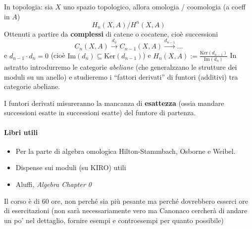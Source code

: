 In topologia: sia \(X\) uno spazio topologico, allora omologia / coomologia (a
coeff in \(A\)) 
\[
  H_{n}{(X, A)} / H^{n}{(X, A)}
\]
Ottenuti a partire da \textbf{complessi} di catene o cocatene, cioè successioni
\[
    C_{n}{(X, A)} \overset{d_{n}}{\to } C_{n-1} {(X, A)} \overset{d_{n-1} }{\to } \dots
\]
e \(d_{n-1} \cdot d_{n} = 0\) (cioè \(\mathrm {Im} {(d_{n})} \subseteq \mathrm{Ker}{(d_{n-1} )} \))  e \(H_{n} {(X, A)} := \frac{\mathrm{Ker}{(d_{n-1} )}}{\mathrm{Im}{(d_{n})}}\) 
In astratto introdurremo le categorie \emph{abeliane} (che generalzzano le
strutture dei moduli su un anello) e studieremo i ``fattori derivati'' di
funtori (additivi) tra categorie abeliane.

I funtori derivati misureranno la mancanza di \textbf{esattezza} (ossia mandare
successioni esatte in successioni esatte) del funtore di
partenza.

\paragraph{Libri utili}
\begin{itemize}[label = --]
    \item Per la parte di algebra omologica Hilton-Stammbach, Osborne e
Weibel.
    \item Dispense sui moduli (su KIRO) utili
    \item Aluffi, \emph{Algebra Chapter 0}
\end{itemize}
Il corso è di 60 ore, non perché sia più pesante ma perché dovrebbero esserci
ore di esercitazioni (non sarà necessariamente vero ma Canonaco cercherà di
andare un po' nel dettaglio, fornire esempi e controesempi per quanto possibile)
